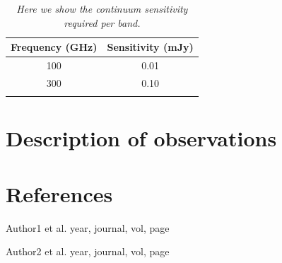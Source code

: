 \documentclass[12pt,a4paper]{article}  %
\begin{document}


\begin{table}[tbh]
\begin{center}
\caption[]{\em{Here we show the continuum sensitivity required per band.}}
\begin{tabular}{cc}
\hline \noalign {\smallskip}
Frequency (GHz) & Sensitivity (mJy) \\
\hline \noalign {\smallskip}
100 & 0.01 \\
300 & 0.10 \\
\hline \noalign {\smallskip}
\end{tabular}
\end{center}
\end{table}

\section{Description of observations}



\section{References}


\noindent [1] Author1 et al. year, journal, vol, page

\noindent [2] Author2 et al. year, journal, vol, page


\end{document}
